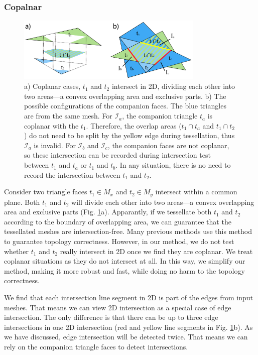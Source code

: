 \documentclass[10pt,journal,compsoc]{IEEEtran}
\begin{document}
\subsubsection{Copalnar}

\begin{figure}[t]
\centering
\includegraphics[width=3.5in]{boolean-03}
\caption{a) Coplanar cases, $t_1$ and $t_2$ intersect in 2D, dividing each other into two areas---a convex overlapping area and exclusive parts. b) The possible configurations of the companion faces. The blue triangles are from the same mesh. For $\mathcal{I}_a$, the companion triangle $t_a$ is coplanar with the $t_1$. Therefore, the overlap areas ($t_1 \cap t_a$ and $t_1 \cap t_2$) do not need to be split by the yellow edge during tessellation, thus $\mathcal{I}_a$ is invalid. For $\mathcal{I}_b$ and $\mathcal{I}_c$, the companion faces are not coplanar, so these intersection can be recorded during intersection test between $t_1$ and $t_a$ or $t_1$ and $t_b$. In any situation, there is no need to record the intersection between $t_1$ and $t_2$.}
\label{fig:coplanar}
\end{figure}

Consider two triangle faces $t_1\in M_x$ and $t_2 \in M_y$ intersect within a common plane. Both $t_1$ and $t_2$ will divide each other into two areas---a convex overlapping area and exclusive parts (Fig. \ref{fig:coplanar}a). Apparantly, if we tessellate both $t_1$ and $t_2$ according to the boundary of overlapping area, we can guarantee that the tessellated meshes are intersection-free. Many previous methods \cite{feito2013fast,zhou2016mesh} use this method to guarantee topology correctness. However, in our method, we do not test whether $t_1$ and $t_2$ really intersect in 2D once we find they are coplanar. We treat coplanar situations as they do not intersect at all. In this way, we simplify our method, making it more robust and fast, while doing no harm to the topology correctness.

We find that each intersection line segment in 2D is part of the edges from input meshes. That means we can view 2D intersection as a special case of edge intersection. The only difference is that there can be up to three edge intersections in one 2D intersection (red and yellow line segments in Fig. \ref{fig:coplanar}b). As we have discussed, edge intersection will be detected twice. That means we can rely on the companion triangle faces to detect intersections.
\end{document}
